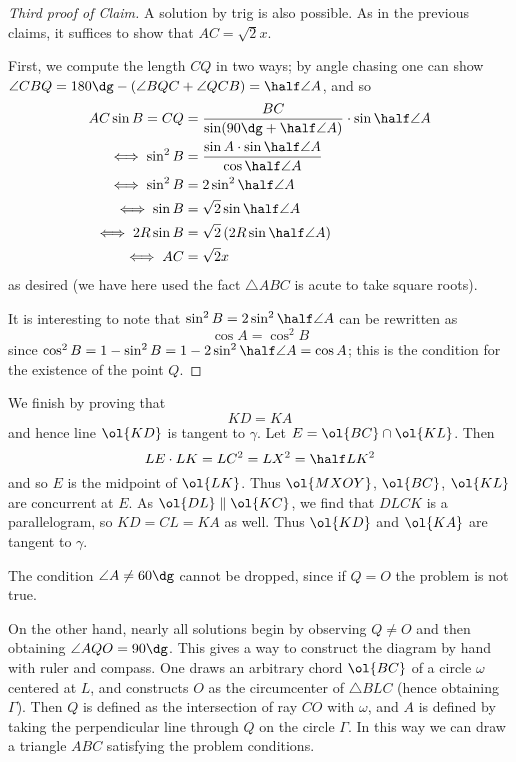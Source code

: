 \begin{proof}
  [Third proof of Claim]
  A solution by trig is also possible.
  As in the previous claims, it suffices to show that $AC = \sqrt 2 x$.

  First, we compute the length $CQ$ in two ways; by angle chasing one can show
  $\angle CBQ = 180\dg - (\angle BQC + \angle QCB) = \half \angle A$,
  and so
  \begin{align*}
    AC \sin B = CQ &= \frac{BC}{\sin(90\dg+\half\angle A)} \cdot \sin\half\angle A \\
    \iff \sin^2 B &= \frac{\sin A \cdot \sin \half \angle A}{\cos \half \angle A} \\
    \iff \sin^2 B &= 2\sin^2 \half \angle A \\
    \iff \sin B &= \sqrt 2 \sin \half \angle A \\
    \iff 2R \sin B &= \sqrt 2 \left(2R \sin \half \angle A\right) \\
    \iff AC &= \sqrt 2 x
  \end{align*}
  as desired (we have here used the fact $\triangle ABC$ is acute to take square roots).

  It is interesting to note that $\sin^2 B = 2 \sin^2 \half \angle A$
  can be rewritten as \[ \cos A = \cos^2 B \]
  since $\cos^2 B = 1 - \sin^2 B = 1 - 2 \sin^2 \half \angle A = \cos A$;
  this is the condition for the existence of the point $Q$.
\end{proof}

We finish by proving that
\[ KD = KA \]
and hence line $\ol{KD}$ is tangent to $\gamma$.
Let $E = \ol{BC} \cap \ol{KL}$.
Then
\[ LE \cdot LK = LC^2 = LX^2 = \half LK^2 \]
and so $E$ is the midpoint of $\ol{LK}$.
Thus $\ol{MXOY}$, $\ol{BC}$, $\ol{KL}$ are concurrent at $E$.
As $\ol{DL} \parallel \ol{KC}$, we find that $DLCK$ is a parallelogram,
so $KD = CL = KA$ as well.
Thus $\ol{KD}$ and $\ol{KA}$ are tangent to $\gamma$.

\begin{remark*}
  The condition $\angle A \neq 60\dg$ cannot be dropped, since if $Q = O$ the problem is not true.

  On the other hand, nearly all solutions begin by observing $Q \neq O$ and then obtaining $\angle AQO = 90\dg$.
  This gives a way to construct the diagram by hand with ruler and compass.
  One draws an arbitrary chord $\ol{BC}$ of a circle $\omega$ centered at $L$,
  and constructs $O$ as the circumcenter of $\triangle BLC$ (hence obtaining $\Gamma$).
  Then $Q$ is defined as the intersection of ray $CO$ with $\omega$,
  and $A$ is defined by taking the perpendicular line through $Q$ on the circle $\Gamma$.
  In this way we can draw a triangle $ABC$ satisfying the problem conditions.
\end{remark*}

